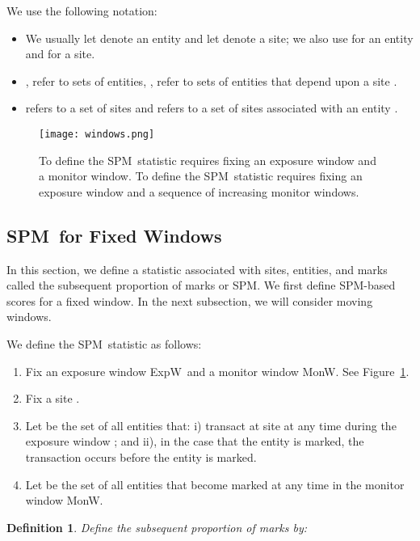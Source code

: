 \documentclass{acm_proc_article-sp}
\newtheorem{definition}{Definition}
\def\spm{\mbox{SPM}}
\def\expwindow{\mbox{ExpW}}
\def\monwindow{\mbox{MonW}}
\begin{document}
We use the following notation:

\begin{itemize}
\item  We usually let  denote an entity and let  denote a site; we also
use  for an entity and  for a site.

\item ,  refer to sets of entities, ,  refer to sets
of entities that depend upon a site  .   

\item  refers to a set of sites
and  refers to a set of sites associated with an entity  .

\end{itemize}


\begin{figure}
\centering
\texttt{[image: windows.png]}
\caption{To define the \spm\  statistic requires fixing an exposure window
and a monitor window. To define the \spm\  statistic requires fixing an exposure window
and a sequence of increasing monitor windows. 
}
\label{figure:windows}
\end{figure}


\subsection{\spm\ for Fixed Windows}

In this section, we define a statistic associated with sites, entities, and marks
called the subsequent proportion of marks or \spm.
We first define \spm-based scores for a fixed window.  In the next subsection,
we will consider moving windows.

We define the \spm\ statistic as follows:

\begin{enumerate}
\item Fix an exposure window \expwindow\  and a monitor window 
\monwindow.   See Figure~\ref{figure:windows}.
\item Fix a site . 
\item Let  be the set of all entities  that: i) transact at site  at
any time during the exposure window ; and ii), in the case that the entity
is marked,  the transaction occurs before the entity is marked.  
\item Let  be the set of all entities  that become marked
at any time in the monitor window \monwindow.   
\end{enumerate}
\begin{definition}
Define the {\em subsequent proportion of marks}  by:

\end{definition}
\end{document}

